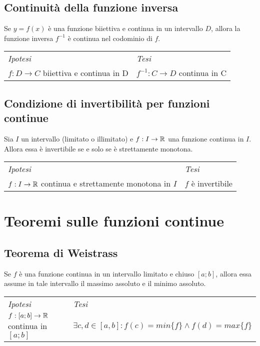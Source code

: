 \documentclass{article}     %
\begin{document}
    \subsection{Continuità della funzione inversa}
        \begin{shadedTheorem}
            Se $y=f(x)$ è una funzione biiettiva e continua in un intervallo $D$, allora la funzione inversa $f^{-1}$ è continua nel codominio di $f$.
        \end{shadedTheorem}
        \begin{tabular}{m{}m{}}
            \textit{Ipotesi} & \textit{Tesi}  \\
            $f:D\to C$ biiettiva e continua in D & $f^{-1}:C\to D$ continua in C 
        \end{tabular}
        
    \subsection{Condizione di invertibilità per funzioni continue}
        \begin{shadedTheorem}
            Sia $I$ un intervallo (limitato o illimitato) e $f:I\rightarrow \mathbb{R}$ una funzione continua in $I$. Allora essa è invertibile se e solo se è strettamente monotona.
        \end{shadedTheorem}
        \begin{tabular}{m{}m{}}
            \textit{Ipotesi} & \textit{Tesi}  \\
            $f:I\to \mathbb{R}$ continua e strettamente monotona in $I$ & $f$ è invertibile 
        \end{tabular}
    
\section{Teoremi sulle funzioni continue}
    \subsection{Teorema di Weistrass}
        \begin{shadedTheorem}[Weistrass]
            Se $f$ è una funzione continua in un intervallo limitato e chiuso $[a;b]$, allora essa assume in tale intervallo il massimo assoluto e il minimo assoluto.
        \end{shadedTheorem}
        \begin{tabular}{m{}m{}}
            \textit{Ipotesi} & \textit{Tesi}  \\
            $f:[a;b]\to \mathbb{R}$ continua in $[a;b]$ & $\exists c,d \in [a,b] : f(c) = min\{f\} \land f(d) = max\{f\}$
        \end{tabular}
    
\end{document}
